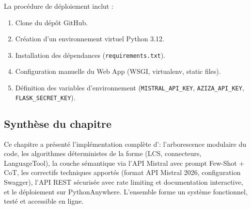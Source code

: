 La procédure de déploiement inclut :
\begin{enumerate}
    \item Clone du dépôt GitHub.
    \item Création d'un environnement virtuel Python 3.12.
    \item Installation des dépendances (\texttt{requirements.txt}).
    \item Configuration manuelle du Web App (WSGI, virtualenv, static files).
    \item Définition des variables d'environnement (\texttt{MISTRAL\_API\_KEY}, \texttt{AZIZA\_API\_KEY}, \texttt{FLASK\_SECRET\_KEY}).
\end{enumerate}

\subsection*{Synthèse du chapitre}

Ce chapitre a présenté l'implémentation complète d'\AZIZA : l'arborescence modulaire du code, les algorithmes déterministes de la forme (LCS, connecteurs, LanguageTool), la couche sémantique via l'API Mistral avec prompt Few-Shot + CoT, les correctifs techniques apportés (format API Mistral 2026, configuration Swagger), l'API REST sécurisée avec rate limiting et documentation interactive, et le déploiement sur PythonAnywhere. L'ensemble forme un système fonctionnel, testé et accessible en ligne.


